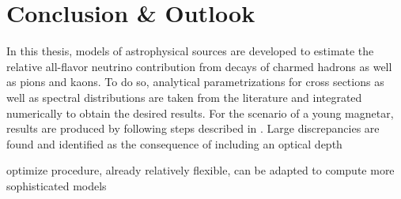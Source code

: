 \chapter{Conclusion \& Outlook}
\label{ch:conclusion}

In this thesis, models of astrophysical sources are developed to estimate the relative all-flavor neutrino contribution from
decays of charmed hadrons as well as pions and kaons. To do so, analytical parametrizations for cross sections as well as spectral
distributions are taken from the literature and integrated numerically to obtain the desired results. For the scenario of a young
magnetar, results are produced by following steps described in \cite{Carpio_2020}. Large discrepancies are found and identified as
the consequence of including an optical depth






optimize procedure, already relatively flexible, can be adapted to compute more sophisticated models

